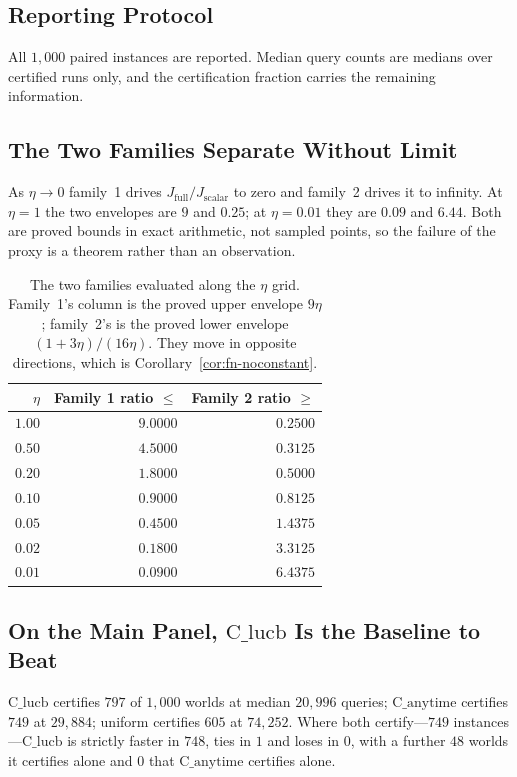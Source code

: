 \documentclass[conference]{IEEEtran}
\theoremstyle{definition}
\begin{document}
\subsection{Reporting Protocol}

All $1{,}000$ paired instances are reported. Median query counts are medians over certified
runs only, and the certification fraction carries the remaining information.

\subsection{The Two Families Separate Without Limit}

As $\eta\to0$ family~1 drives $J_{\mathrm{full}}/J_{\mathrm{scalar}}$ to zero and family~2
drives it to infinity. At $\eta=1$ the two envelopes are $9$ and $0.25$; at $\eta=0.01$ they
are $0.09$ and $6.44$. Both are proved bounds in exact arithmetic, not sampled points, so the
failure of the proxy is a theorem rather than an observation.

\begin{table}[htbp]
\caption{The two families evaluated along the $\eta$ grid. Family~1's column is the proved
upper envelope $9\eta$; family~2's is the proved lower envelope $(1+3\eta)/(16\eta)$. They
move in opposite directions, which is Corollary~\ref{cor:fn-noconstant}.}
\label{tab:fn-families}
\centering
\footnotesize
\begin{tabular}{@{}rrr@{}}
\toprule
$\eta$ & Family 1 ratio $\le$ & Family 2 ratio $\ge$ \\
\midrule
$1.00$ & $9.0000$ & $0.2500$ \\
$0.50$ & $4.5000$ & $0.3125$ \\
$0.20$ & $1.8000$ & $0.5000$ \\
$0.10$ & $0.9000$ & $0.8125$ \\
$0.05$ & $0.4500$ & $1.4375$ \\
$0.02$ & $0.1800$ & $3.3125$ \\
$0.01$ & $0.0900$ & $6.4375$ \\
\bottomrule
\end{tabular}
\end{table}

\subsection{On the Main Panel, $\mathrm{C\_lucb}$ Is the Baseline to Beat}

$\mathrm{C\_lucb}$ certifies $797$ of $1{,}000$ worlds at median $20{,}996$ queries;
$\mathrm{C\_anytime}$ certifies $749$ at $29{,}884$; uniform certifies $605$ at $74{,}252$.
Where both certify---$749$ instances---$\mathrm{C\_lucb}$ is strictly faster in $748$, ties
in $1$ and loses in $0$, with a further $48$ worlds it certifies alone and $0$ that
$\mathrm{C\_anytime}$ certifies alone.
\end{document}
